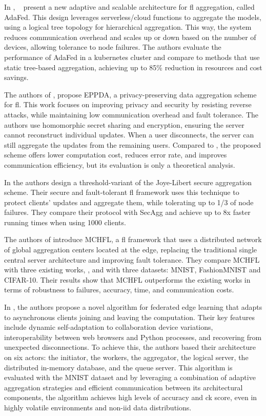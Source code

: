 In \cite{Jayaram2022180}, ~\citeauthor{Jayaram2022180} present a new adaptive and scalable architecture for \ac{fl} aggregation, called AdaFed. This design leverages serverless/cloud functions to aggregate the models, using a logical tree topology for hierarchical aggregation. This way, the system reduces communication overhead and scales up or down based on the number of devices, allowing tolerance to node failures. The authors evaluate the performance of AdaFed in a kubernetes cluster and compare to methods that use static tree-based aggregation, achieving up to 85\% reduction in resources and cost savings.

The authors of \cite{Song20233047}, propose EPPDA, a privacy-preserving data aggregation scheme for \ac{fl}. This work focuses on improving privacy and security by resisting reverse attacks, while maintaining low communication overhead and fault tolerance. The authors use homomorphic secret sharing and encryption, ensuring the server cannot reconstruct individual updates. When a user disconnects, the server can still aggregate the updates from the remaining users. Compared to \cite{bonawitz2017practical}, the proposed scheme offers lower computation cost, reduces error rate, and improves communication efficiency, but its evaluation is only a theoretical analysis.

In \cite{Mansouri2022146} the authors design a threshold-variant of the Joye-Libert secure aggregation scheme. Their secure and fault-tolerant \ac{fl} framework uses this technique to protect clients' updates and aggregate them, while tolerating up to 1/3 of node failures. They compare their protocol with SecAgg and achieve up to 8x faster running times when using 1000 clients.

The authors of \cite{Chen20241} introduce MCHFL, a \ac{fl} framework that uses a distributed network of global aggregation centers located at the edge, replacing the traditional single central server architecture and improving fault tolerance. They compare MCHFL with three existing works, \cite{konevcny2016federated}, \cite{sattler2020clustered} and \cite{liu2020client} with three datasets: MNIST, FashionMNIST and CIFAR-10. Their results show that MCHFL outperforms the existing works in terms of robustness to failures, accuracy, time, and communication costs.

In \cite{Morell202253}, the authors propose a novel algorithm for federated edge learning that adapts to asynchronous clients joining and leaving the computation. Their key features include dynamic self-adaptation to collaboration device variations, interoperability between web browsers and Python processes, and recovering from unexpected disconnections. To achieve this, the authors based their architecture on six actors: the initiator, the workers, the aggregator, the logical server, the distributed in-memory database, and the queue server. This algorithm is evaluated with the MNIST dataset and by leveraging a combination of adaptive aggregation strategies and efficient communication between its architectural components, the algorithm achieves high levels of accuracy and \ac{ck} score, even in highly volatile environments and \ac{non-iid} data distributions. 

